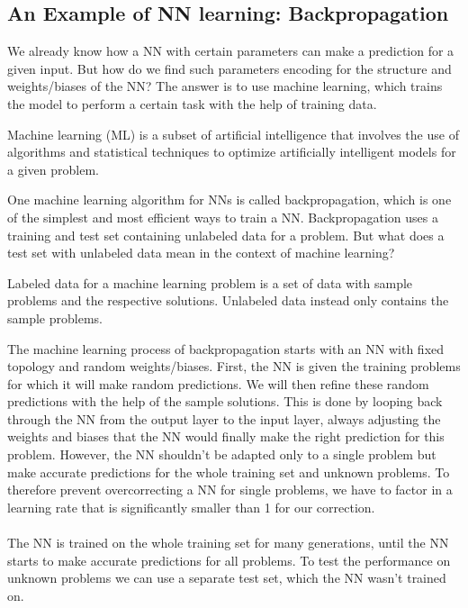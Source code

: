 \documentclass[11pt]{report}
\newcommand{\mydeflabel}{}
\newenvironment{mydef}[1]
 {\renewcommand\mydeflabel{#1}\begin{mydefinner}}
 {\end{mydefinner}}
\begin{document}
            \subsection{An Example of NN learning: Backpropagation}\label{subsec:an-example-of-nn-learning:-backpropagation}
    We already know how a NN with certain parameters can make a prediction for a given input.
    But how do we find such parameters encoding for the structure and weights/biases of the NN?
    The answer is to use machine learning, which trains the model to perform a certain task with the help of training data.
    \begin{mydef}{Machine Learning}
        Machine learning (ML) is a subset of artificial intelligence that involves the use of algorithms and statistical techniques to optimize artificially intelligent models for a given problem.
    \end{mydef}
    One machine learning algorithm for NNs is called backpropagation, which is one of the simplest and most efficient ways to train a NN.\@
    Backpropagation uses a training and test set containing unlabeled data for a problem.
    But what does a test set with unlabeled data mean in the context of machine learning?
    \begin{mydef}{(Un)labeled Data}
        Labeled data for a machine learning problem is a set of data with sample problems and the respective solutions.
        Unlabeled data instead only contains the sample problems.
    \end{mydef}
    The machine learning process of backpropagation starts with an NN with fixed topology and random weights/biases.
    First, the NN is given the training problems for which it will make random predictions.
    We will then refine these random predictions with the help of the sample solutions.
    This is done by looping back through the NN from the output layer to the input layer, always adjusting the weights and biases that the NN would finally make the right prediction for this problem.
    However, the NN shouldn't be adapted only to a single problem but make accurate predictions for the whole training set and unknown problems.
    To therefore prevent overcorrecting a NN for single problems, we have to factor in a learning rate that is significantly smaller than 1 for our correction.
    \\ \\
    The NN is trained on the whole training set for many generations, until the NN starts to make accurate predictions for all problems.
    To test the performance on unknown problems we can use a separate test set, which the NN wasn't trained on.
\end{document}
